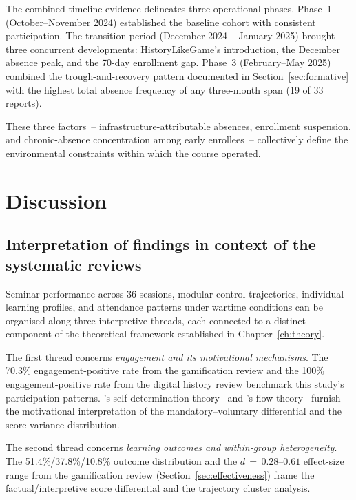 The combined timeline evidence delineates three operational phases. Phase~1 (October--November 2024) established the baseline cohort with consistent participation. The transition period (December 2024 -- January 2025) brought three concurrent developments: HistoryLikeGame's introduction, the December absence peak, and the 70-day enrollment gap. Phase~3 (February--May 2025) combined the trough-and-recovery pattern documented in Section~\ref{sec:formative} with the highest total absence frequency of any three-month span (19 of 33 reports).

These three factors~-- infrastructure-attributable absences, enrollment suspension, and chronic-absence concentration among early enrollees~-- collectively define the environmental constraints within which the course operated.

\section{Discussion} \label{sec:discussion}

\subsection{Interpretation of findings in context of the systematic reviews}

Seminar performance across 36 sessions, modular control trajectories, individual learning profiles, and attendance patterns under wartime conditions can be organised along three interpretive threads, each connected to a distinct component of the theoretical framework established in Chapter~\ref{ch:theory}.

The first thread concerns \emph{engagement and its motivational mechanisms}. The 70.3\% engagement-positive rate from the gamification review \cite{KorniienkoSemerikov2024} and the 100\% engagement-positive rate from the digital history review \cite{Korniienko2025cte} benchmark this study's participation patterns. \citeauthor{RyanDeci2000}'s self-determination theory~\cite{RyanDeci2000} and \citeauthor{Csikszentmihalyi1990}'s flow theory~\cite{Csikszentmihalyi1990} furnish the motivational interpretation of the mandatory--voluntary differential and the score variance distribution.

The second thread concerns \emph{learning outcomes and within-group heterogeneity}. The 51.4\%/37.8\%/10.8\% outcome distribution and the \(d\,=\,0.28\)--\(0.61\) effect-size range from the gamification review (Section~\ref{sec:effectiveness}) frame the factual/interpretive score differential and the trajectory cluster analysis.

